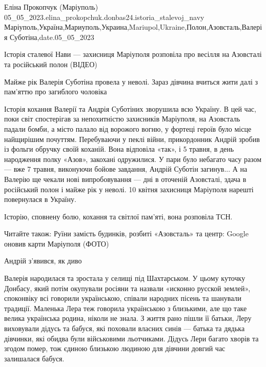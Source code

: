  
 
 
 
 

Еліна Прокопчук (Маріуполь)
05_05_2023.elina_prokopchuk.donbas24.istoria_stalevoj_navy
Маріуполь,Україна,Мариуполь,Украина,Mariupol,Ukraine,Полон,Азовсталь,Валерія Суботіна,date.05_05_2023

Історія сталевої Нави — захисниця Маріуполя розповіла про весілля на Азовсталі та російський полон (ВІДЕО)

Майже рік Валерія Суботіна провела у неволі. Зараз дівчина вчиться жити далі з
пам'яттю про загиблого чоловіка

Історія кохання Валерії та Андрія Суботіних зворушила всю Україну. В цей час,
поки світ спостерігав за непохитністю захисників Маріуполя, на Азовсталь падали
бомби, а місто палало від ворожого вогню, у фортеці героїв було місце
найщирішим почуттям. Перебуваючи у пеклі війни, прикордонник Андрій зробив із
фольги обручку своїй коханій. Вона відповіла «так», і 5 травня, в день
народження полку «Азов», закохані одружилися. У пари було небагато часу разом —
вже 7 травня, виконуючи бойове завдання, Андрій Суботін загинув... А на Валерію
ще чекали нові випробовування — дні в оточеній Азовсталі, здача в російський
полон і майже рік у неволі. 10 квітня захисниця Маріуполя нарешті повернулася в
Україну.

Історію, сповнену болю, кохання та світлої пам'яті, вона розповіла ТСН.

Читайте також: Руїни замість будинків, розбиті «Азовсталь» та центр: Google
оновив карти Маріуполя (ФОТО)

Андрій з'явився, як диво

Валерія народилася та зростала у селищі під Шахтарськом. У цьому куточку
Донбасу, який потім окупували росіяни та назвали «исконно русской землей»,
споконвіку всі говорили українською, співали народних пісень та шанували
традиції. Маленька Лера теж говорила українською з близькими, але що таке
велика українська родина, ніколи не знала. З життя рано пішли її батьки, Леру
виховували дідусь та бабуся, які поховали власних синів — батька та дядька
дівчинки, які обидва були військовими льотчиками. Дідусь Лери багато хворів та
згодом помер, тож єдиною близькою людиною для дівчини довгий час залишалася
бабуся.

